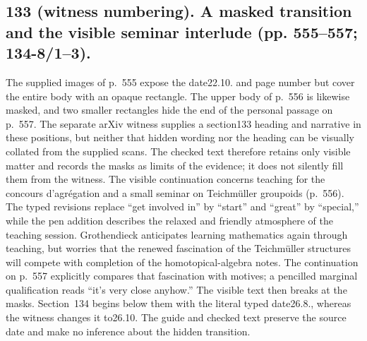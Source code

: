 \documentclass[10pt,oneside]{book}
\begin{document}
\subsection*{133 (witness numbering). A masked transition and the visible seminar interlude (pp. 555--557; 134-8/1--3).}
The supplied images of p.~555 expose the date22.10. and page number but cover the entire body with an opaque rectangle. The upper body of p.~556 is likewise masked, and two smaller rectangles hide the end of the personal passage on p.~557. The separate arXiv witness supplies a section133 heading and narrative in these positions, but neither that hidden wording nor the heading can be visually collated from the supplied scans. The checked text therefore retains only visible matter and records the masks as limits of the evidence; it does not silently fill them from the witness. The visible continuation concerns teaching for the concours d'agr\'egation and a small seminar on Teichm\"uller groupoids (p.~556). The typed revisions replace ``get involved in'' by ``start'' and ``great'' by ``special,'' while the pen addition describes the relaxed and friendly atmosphere of the teaching session. Grothendieck anticipates learning mathematics again through teaching, but worries that the renewed fascination of the Teichm\"uller structures will compete with completion of the homotopical-algebra notes. The continuation on p.~557 explicitly compares that fascination with motives; a pencilled marginal qualification reads ``it's very close anyhow.'' The visible text then breaks at the masks. Section~134 begins below them with the literal typed date26.8., whereas the witness changes it to26.10. The guide and checked text preserve the source date and make no inference about the hidden transition.
\end{document}
